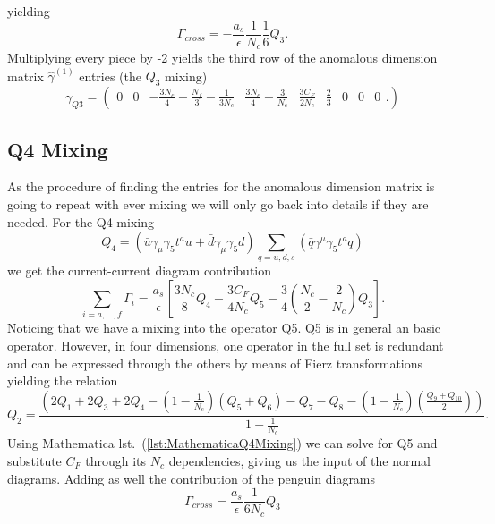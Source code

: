 	yielding
	\begin{equation}
		\Gamma_{cross} = -\frac{a_s}{\epsilon} \frac{1}{N_c} \frac{1}{6} Q_3.
	\end{equation}
	Multiplying every piece by -2 yields the third row of the anomalous dimension matrix $\hat \gamma^{(1)}$ entries (the $Q_3$ mixing) 
	\begin{equation}
		\gamma_{Q3} = 
		(
		\begin{matrix}
			0 & 0 & -\frac{3N_c}{4}+\frac{N_f}{3}-\frac{1}{3N_c} & \frac{3N_c}{4} - \frac{3}{N_c} & \frac{3C_F}{2 N_c} & \frac{2}{3} & 0 & 0 & 0
		\end{matrix}.
		)
	\end{equation}

	\subsection*{Q4 Mixing}
	As the procedure of finding the entries for the anomalous dimension matrix is going to repeat with ever mixing we will only go back into details if they are needed. For the Q4 mixing
	\begin{equation}
		Q_4 = (\bar u \gamma_\mu \gamma_5 t^a u + \bar d \gamma_\mu \gamma_5 d) \sum_{q=u,d,s} (\bar q \gamma^\mu \gamma_5 t^a q)
	\end{equation}
	we get the current-current diagram contribution
	\begin{equation}
		\sum_{i=a,\ldots,f}\Gamma_i = \frac{a_s}{\epsilon}\left[\frac{3N_c}{8}Q_4 -\frac{3C_F}{4N_c}Q_5 -\frac{3}{4}\left(\frac{N_c}{2}-\frac{2}{N_c}\right)Q_3\right].
	\end{equation}
	Noticing that we have a mixing into the operator Q5. Q5 is in general an basic operator. However, in four dimensions, one operator in the full set is redundant and can be expressed through the others by means of Fierz transformations yielding the relation
	\begin{equation}
		Q_2 = \frac{\left(2Q_1 + 2Q_3 + 2Q_4 -\left(1-\frac{1}{N_c}\right)(Q_5 + Q_6)- Q_7 -Q_8 -\left(1-\frac{1}{N_c}\right)\left(\frac{Q_9 + Q_{10}}{2}\right)\right)}{1-\frac{1}{N_c}}.
	\end{equation}
	Using Mathematica lst.~(\ref{lst:MathematicaQ4Mixing}) we can solve for Q5 and substitute $C_F$ through its $N_c$ dependencies, giving us the input of the normal diagrams. Adding as well the contribution of the penguin diagrams
	\begin{equation}
		\Gamma_{cross} = \frac{a_s}{\epsilon} \frac{1}{6N_c} Q_3
	\end{equation}
